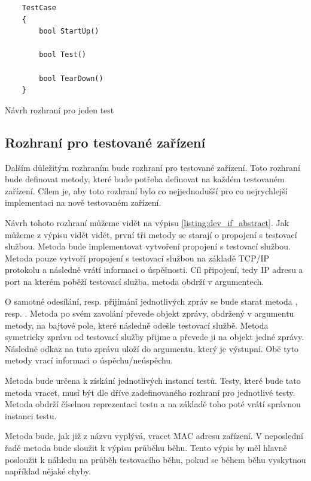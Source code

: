 \begin{listing}[htbp]
    \begin{verbatim}
    TestCase 
    {
        bool StartUp()

        bool Test()

        bool TearDown()
    }
    \end{verbatim}
\caption{Návrh rozhraní pro jeden test}
\label{listing:test_if}
\end{listing}



\subsection{Rozhraní pro testované zařízení}

Dalším důležitým rozhraním bude rozhraní pro testované zařízení. Toto rozhraní bude definovat metody, které bude potřeba definovat na každém testovaném zařízení. Cílem je, aby toto rozhraní bylo co nejjednodušší pro co nejrychlejší implementaci na nově testovaném zařízení.

Návrh tohoto rozhraní můžeme vidět na výpisu \ref{listing:dev_if_abstract}. Jak můžeme z výpisu vidět vidět, první tři metody se starají o propojení s testovací službou. Metoda  bude implementovat vytvoření propojení s testovací službou. Metoda pouze vytvoří propojení s testovací službou na základě TCP/IP protokolu a následně vrátí informaci o úspěšnosti. Cíl připojení, tedy IP adresu a port na kterém poběží testovací služba, metoda obdrží v argumentech.

O samotné odesílání, resp. přijímání jednotlivých zpráv se bude starat metoda , resp. . Metoda  po svém zavolání převede objekt zprávy, obdržený v argumentu metody, na bajtové pole, které následně odešle testovací službě. Metoda  symetricky zprávu od testovací služby přijme a převede ji na objekt jedné zprávy. Následně odkaz na tuto zprávu uloží do argumentu, který je výstupní. Obě tyto metody vrací informaci o úspěchu/neúspěchu.

Metoda  bude určena k získání jednotlivých instancí testů. Testy, které bude tato metoda vracet, musí být dle dříve zadefinovaného rozhraní pro jednotlivé testy. Metoda obdrží číselnou reprezentaci testu a na základě toho poté vrátí správnou instanci testu. 

Metoda  bude, jak již z názvu vyplývá, vracet MAC adresu zařízení. V neposlední řadě metoda  bude sloužit k výpisu průběhu běhu. Tento výpis by měl hlavně posloužit k náhledu na průběh testovacího běhu, pokud se během běhu vyskytnou například nějaké chyby.

